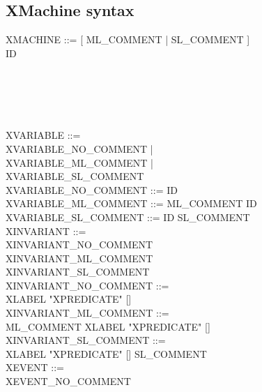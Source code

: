\subsection{XMachine syntax}
\label{sec:xmachine-syntax}
\begin{center}
  \begin{Bcode}
    XMACHINE ::= [ ML_COMMENT | SL_COMMENT ]\\
    \Btab \Btab \Bmachine{} ID \\
    \Btab \Btab [\Brefines{} ID\\
    \Btab \Btab [\Bsees{} ID \{ ID \}\\
    \Btab \Btab [\Bvariables{} XVARIABLE \{XVARIABLE\}]\\
    \Btab {}\\
    \Btab {}\\
    \Btab {} \\
    \Btab \Btab \Bend \\
    XVARIABLE ::= \\
    \Btab \Btab XVARIABLE\_NO\_COMMENT | \\
    \Btab \Btab XVARIABLE\_ML\_COMMENT | \\
    \Btab \Btab XVARIABLE\_SL\_COMMENT \\
    XVARIABLE\_NO\_COMMENT ::= ID \\
    XVARIABLE\_ML\_COMMENT ::= ML\_COMMENT ID \\
    XVARIABLE\_SL\_COMMENT ::= ID SL\_COMMENT \\
    XINVARIANT ::=\\
    \Btab \Btab XINVARIANT\_NO\_COMMENT\\
    \Btab \Btab XINVARIANT\_ML\_COMMENT\\
    \Btab \Btab XINVARIANT\_SL\_COMMENT\\
    XINVARIANT\_NO\_COMMENT ::= \\
    \Btab \Btab XLABEL "XPREDICATE" [\Btheorem] \\
    XINVARIANT\_ML\_COMMENT ::= \\
    \Btab \Btab ML\_COMMENT XLABEL "XPREDICATE" [\Btheorem]\\
    XINVARIANT\_SL\_COMMENT ::= \\
    \Btab \Btab XLABEL "XPREDICATE" [\Btheorem] SL\_COMMENT\\
    XEVENT ::= \\
    \Btab \Btab XEVENT\_NO\_COMMENT\\

\end{Bcode}
\end{center}
